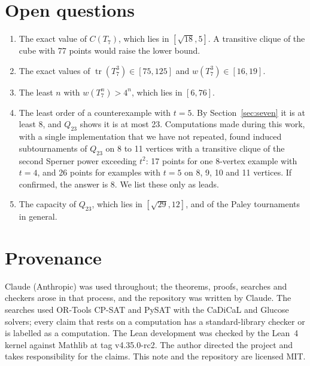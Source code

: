 \documentclass[11pt]{article}
\theoremstyle{definition}
\theoremstyle{remark}
\newcommand{\tr}{\operatorname{tr}}
\begin{document}
\section{Open questions}\label{sec:open}

\begin{enumerate}
\item The exact value of $C(T_7)$, which lies in $[\sqrt{18}, 5]$. A transitive clique of the cube
with 77 points would raise the lower bound.
\item The exact values of $\tr(T_7^3) \in [75, 125]$ and $w(T_7^3) \in [16, 19]$.
\item The least $n$ with $w(T_7^n) > 4^n$, which lies in $[6, 76]$.
\item The least order of a counterexample with $t = 5$. By Section~\ref{sec:seven} it is at least 8,
and $Q_{23}$ shows it is at most 23. Computations made during this work, with a single
implementation that we have not repeated, found induced subtournaments of $Q_{23}$ on 8 to 11
vertices with a transitive clique of the second Sperner power exceeding $t^2$: 17 points for one
8-vertex example with $t = 4$, and 26 points for examples with $t = 5$ on 8, 9, 10 and 11
vertices. If confirmed, the answer is 8. We list these only as leads.
\item The capacity of $Q_{23}$, which lies in $[\sqrt{29}, 12]$, and of the Paley tournaments in
general.
\end{enumerate}

\section*{Provenance}

Claude (Anthropic) was used throughout; the theorems, proofs, searches and checkers arose in that
process, and the repository was written by Claude. The searches used OR-Tools CP-SAT and PySAT with
the CaDiCaL and Glucose solvers; every claim that rests on a computation has a standard-library
checker or is labelled as a computation. The Lean development was checked by the Lean~4 kernel
\cite{lean} against Mathlib \cite{mathlib} at tag v4.35.0-rc2. The author directed the project and
takes responsibility for the claims. This note and the repository are licensed MIT.
\end{document}
